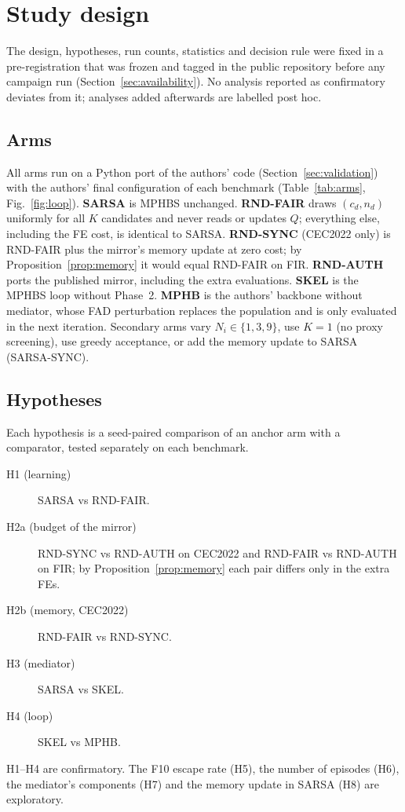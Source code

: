 \documentclass[11pt]{article}
\theoremstyle{definition}
\theoremstyle{remark}
\begin{document}
\section{Study design}
\label{sec:design}

The design, hypotheses, run counts, statistics and decision rule were fixed in a pre-registration that was frozen and
tagged in the public repository before any campaign run (Section~\ref{sec:availability}). No analysis reported as
confirmatory deviates from it; analyses added afterwards are labelled post hoc.

\subsection{Arms}
All arms run on a Python port of the authors' code (Section~\ref{sec:validation}) with the authors' final configuration
of each benchmark (Table~\ref{tab:arms}, Fig.~\ref{fig:loop}).
\textbf{SARSA} is MPHBS unchanged.
\textbf{RND-FAIR} draws $(c_d,n_d)$ uniformly for all $K$ candidates and never reads or updates $Q$; everything else,
including the FE cost, is identical to SARSA.
\textbf{RND-SYNC} (CEC2022 only) is RND-FAIR plus the mirror's memory update at zero cost; by
Proposition~\ref{prop:memory} it would equal RND-FAIR on FIR.
\textbf{RND-AUTH} ports the published mirror, including the extra evaluations.
\textbf{SKEL} is the MPHBS loop without Phase~2.
\textbf{MPHB} is the authors' backbone without mediator, whose FAD perturbation replaces the population and is only
evaluated in the next iteration.
Secondary arms vary $N_i\in\{1,3,9\}$, use $K=1$ (no proxy screening), use greedy acceptance, or add the memory update to
SARSA (SARSA-SYNC).



\subsection{Hypotheses}
Each hypothesis is a seed-paired comparison of an anchor arm with a comparator, tested separately on each benchmark.
\begin{description}
\item[H1 (learning)] SARSA vs RND-FAIR.
\item[H2a (budget of the mirror)] RND-SYNC vs RND-AUTH on CEC2022 and RND-FAIR vs RND-AUTH on FIR; by
  Proposition~\ref{prop:memory} each pair differs only in the extra FEs.
\item[H2b (memory, CEC2022)] RND-FAIR vs RND-SYNC.
\item[H3 (mediator)] SARSA vs SKEL.
\item[H4 (loop)] SKEL vs MPHB.
\end{description}
H1--H4 are confirmatory. The F10 escape rate (H5), the number of episodes (H6), the mediator's components (H7) and the
memory update in SARSA (H8) are exploratory.
\end{document}

